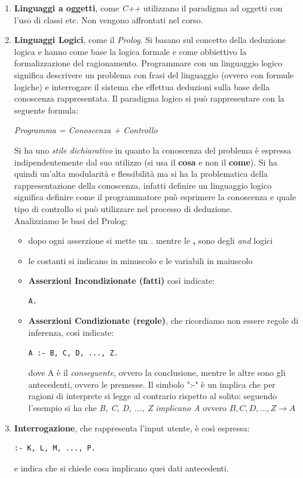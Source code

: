 \documentclass[a4paper,12pt, oneside]{book}
\begin{document}
\begin{enumerate}
\item \textbf{Linguaggi a oggetti}, come \textit{C++} utilizzano il paradigma ad oggetti con l'uso di classi etc. Non vengono affrontati nel corso.
\item \textbf{Linguaggi Logici}, come il \textit{Prolog}. Si basano sul concetto della deduzione logica e hanno come base la logica formale e come obbiettivo la formalizzazione del ragionamento. Programmare con un linguaggio logico significa descrivere un problema con frasi del linguaggio (ovvero con formule logiche) e interrogare il sistema che effettua deduzioni sulla base della conoscenza rappresentata. Il paradigma logico si può rappresentare con la seguente formula:
\begin{center}
\textit{Programma = Conoscenza + Controllo}
\end{center}
Si ha uno \textit{stile dichiarativo} in quanto la conoscenza del problema è espressa indipendentemente dal suo utilizzo (si usa il \textbf{cosa} e non il \textbf{come}). Si ha quindi un'alta modularità e flessibilità ma si ha la problematica della rappresentazione della conoscenza, infatti definire un linguaggio logico significa definire come il programmatore può esprimere la conoscenza e quale tipo di controllo si può utilizzare nel processo di deduzione.\\
Analizziamo le basi del Prolog:
\begin{itemize}
\item dopo ogni asserzione si mette un \textit{.} mentre le \textbf{,} sono degli \textit{and} logici
\item le costanti si indicano in minuscolo e le variabili in maiuscolo
\item \textbf{Asserzioni Incondizionate (fatti)} così indicate:
\begin{verbatim}
A.
\end{verbatim}
\item \textbf{Asserzioni Condizionate (regole)}, che ricordiamo non essere regole di inferenza, così indicate:
\begin{verbatim}
A :- B, C, D, ..., Z.
\end{verbatim}
dove A è il \textit{conseguente}, ovvero la conclusione, mentre le altre sono gli antecedenti, ovvero le premesse. Il simbolo ":-" è un implica che per ragioni di interprete si legge al contrario rispetto al solito: seguendo l'esempio si ha che \textit{B, C, D, ..., Z implicano A} ovvero $B, C, D, ..., Z \to A$
\end{itemize}
\item \textbf{Interrogazione}, che rappresenta l'input utente, è così espressa:
\begin{verbatim}
:- K, L, M, ..., P.
\end{verbatim}
e indica che si chiede cosa implicano quei dati antecedenti.


\end{enumerate}
\end{document}
